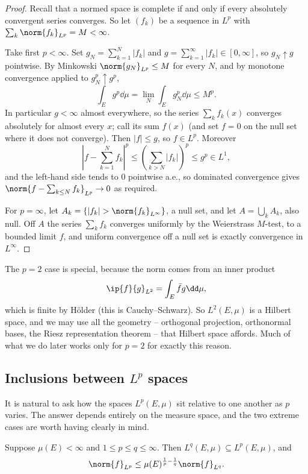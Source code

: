 \begin{proof}
	Recall that a normed space is complete if and only if every absolutely convergent series converges. So let $(f_k)$ be a sequence in $L^p$ with $\sum_k \norm{f_k}_{L^p} = M < \infty$.

	Take first $p < \infty$. Set $g_N = \sum_{k=1}^N |f_k|$ and $g = \sum_{k=1}^\infty |f_k| \in [0,\infty]$, so $g_N \uparrow g$ pointwise. By Minkowski $\norm{g_N}_{L^p} \le M$ for every $N$, and by monotone convergence applied to $g_N^p \uparrow g^p$,
	$$\int_E g^p \dd \mu = \lim_N \int_E g_N^p \dd\mu \le M^p.$$
	In particular $g < \infty$ almost everywhere, so the series $\sum_k f_k(x)$ converges absolutely for almost every $x$; call its sum $f(x)$ (and set $f = 0$ on the null set where it does not converge). Then $|f| \le g$, so $f \in L^p$. Moreover
	$$\left| f - \sum_{k=1}^N f_k \right|^p \le \left( \sum_{k > N} |f_k|\right)^p \le g^p \in L^1,$$
	and the left-hand side tends to $0$ pointwise a.e., so dominated convergence gives $\norm{f - \sum_{k \le N} f_k}_{L^p} \to 0$ as required.

	For $p = \infty$, let $A_k = \{|f_k| > \norm{f_k}_{L^\infty}\}$, a null set, and let $A = \bigcup_k A_k$, also null. Off $A$ the series $\sum_k f_k$ converges uniformly by the Weierstrass $M$-test, to a bounded limit $f$, and uniform convergence off a null set is exactly convergence in $L^\infty$.
\end{proof}

The $p = 2$ case is special, because the norm comes from an inner product
$$\ip{f}{g}_{L^2} = \int_E \bar f g \dd \mu,$$
which is finite by H\"older (this is Cauchy--Schwarz). So $L^2(E,\mu)$ is a Hilbert space, and we may use all the geometry -- orthogonal projection, orthonormal bases, the Riesz representation theorem -- that Hilbert space affords. Much of what we do later works only for $p = 2$ for exactly this reason.

\subsection{Inclusions between \texorpdfstring{$L^p$}{Lp} spaces}

It is natural to ask how the spaces $L^p(E,\mu)$ sit relative to one another as $p$ varies. The answer depends entirely on the measure space, and the two extreme cases are worth having clearly in mind.

\begin{proposition}\label{prop:finiteinclusion}
	Suppose $\mu(E) < \infty$ and $1 \le p \le q \le \infty$. Then $L^q(E,\mu) \subseteq L^p(E,\mu)$, and
	$$\norm{f}_{L^p} \le \mu(E)^{\frac 1p - \frac 1q} \norm{f}_{L^q}.$$
\end{proposition}

